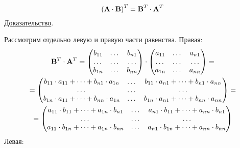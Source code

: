 \documentclass[../../calc-math-exam-2023.tex]{subfiles}
\begin{document}
    \begin{theorem}
        \begin{equation*}
            \left( \bf{A} \cdot \bf{B} \right)^T = \bf{B}^T \cdot \bf{A}^T
        \end{equation*}
        \underline{Доказательство}.

        Рассмотрим отдельно левую и правую части равенства. Правая:
        \begin{gather*}
            \bf{B}^T \cdot \bf{A}^T =
            \begin{pmatrix}
                b_{11} & \dots & b_{n1} \\
                \dots  & \dots & \dots  \\
                b_{1n} & \dots & b_{nn}
            \end{pmatrix}
            \cdot
            \begin{pmatrix}
                a_{11} & \dots & a_{n1} \\
                \dots  & \dots & \dots  \\
                a_{1n} & \dots & a_{nn}
            \end{pmatrix} =\\
            =\begin{pmatrix}
                 b_{11} \cdot a_{11} + \dots + b_{n1} \cdot a_{1n} & \dots & b_{11} \cdot a_{n1} + \dots + b_{n1} \cdot a_{nn} \\
                 \dots                                             & \dots & \dots                                             \\
                 b_{1n} \cdot a_{11} + \dots + b_{nn} \cdot a_{1n} & \dots & b_{1n} \cdot a_{n1} + \dots + b_{nn} \cdot a_{nn}
            \end{pmatrix} = \\
            = \begin{pmatrix}
                  a_{11} \cdot b_{11} + \dots + a_{1n} \cdot b_{n1} & \dots & a_{n1} \cdot b_{11} + \dots + a_{nn} \cdot b_{n1} \\
                  \dots                                             & \dots & \dots                                             \\
                  a_{11} \cdot b_{1n} + \dots + a_{1n} \cdot b_{nn} & \dots & a_{n1} \cdot b_{1n} + \dots + a_{nn} \cdot b_{nn}
            \end{pmatrix}
        \end{gather*}
        Левая:
        \begin{gather*}

\end{gather*}
\end{theorem}
\end{document}
